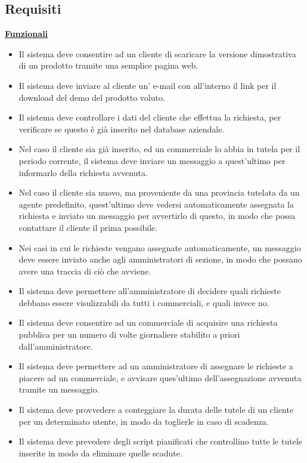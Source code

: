 \subsection{Requisiti}
\underline{\textbf{Funzionali}}
\begin{itemize}
  \item Il sistema deve consentire ad un cliente di scaricare la versione dimostrativa di un prodotto tramite una semplice pagina web.
  \item Il sistema deve inviare al cliente un' e-mail con all'interno il link per il download del demo del prodotto voluto. 
  \item Il sistema deve controllare i dati del cliente che effettua la richiesta, per verificare se questo \`e gi\`a inserito nel database aziendale.
  \item Nel caso il cliente sia gi\`a inserito, ed un commerciale lo abbia in tutela per il periodo corrente, il sistema deve inviare un messaggio a quest'ultimo per informarlo della richiesta avvenuta.
  \item Nel caso il cliente sia nuovo, ma proveniente da una provincia tutelata da un agente predefinito, quest'ultimo deve vedersi automaticamente assegnata la richiesta e inviato un messaggio per avvertirlo di questo, in modo che possa contattare il cliente il prima possibile.
  \item Nei casi in cui le richieste vengano assegnate automaticamente, un messaggio deve essere inviato anche agli amministratori di sezione, in modo che possano avere una traccia di ci\`o che avviene.
  \item Il sistema deve permettere all'amministratore di decidere quali richieste debbano essere visulizzabili da tutti i commerciali, e quali invece no.
  \item Il sistema deve consentire ad un commerciale di acquisire una richiesta pubblica per un numero di volte giornaliere stabilito a priori dall'amministratore.
  \item Il sistema deve permettere ad un amministratore di assegnare le richieste a piacere ad un commerciale, e avvisare ques'ultimo dell'assegnazione avvenuta tramite un messaggio.
  \item Il sistema deve provvedere a conteggiare la durata delle tutele di un cliente per un determinato utente, in modo da toglierle in caso di scadenza.
  \item Il sistema deve prevedere degli script pianificati che controllino tutte le tutele inserite in modo da eliminare quelle scadute.
\end{itemize}

